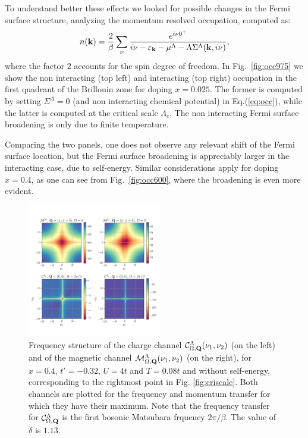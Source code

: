 To understand better these effects we looked for possible changes in the Fermi surface structure, analyzing the momentum resolved occupation, computed as: 
\begin{equation}
 n(\mathbf{k})  = \frac{2}{\beta} \sum_{\nu}\frac{e^{i\nu 0^+}}{i\nu-\varepsilon_{\mathbf{k}}-\mu^\Lambda-\Lambda\Sigma^\Lambda(\mathbf{k},i\nu)},\label{eq:occ} 
\end{equation}
where the factor $2$ accounts for the spin degree of freedom. 
In Fig.~\ref{fig:occ975} we show the non interacting (top left) and interacting (top right) occupation in the first quadrant of the Brillouin zone for doping $x=0.025$.
The former is computed by setting $\Sigma^\Lambda=0$ (and non interacting chemical potential) in Eq.(\ref{eq:occ}), while the latter is computed at the critical scale $\Lambda_c$. 
The non interacting Fermi surface broadening is only due to finite temperature.

Comparing the two panels, one does not observe any relevant shift of the Fermi surface location, but the Fermi surface broadening is appreciably larger in the interacting case, due to self-energy.
Similar considerations apply for doping $x=0.4$, as one can see from Fig.~\ref{fig:occ600}, where the broadening is even more evident.  

\begin{figure}
\hspace*{-1.0cm}
\includegraphics[width=0.52\textwidth]{images/Phi_color_all.png}
\caption{Frequency structure of the charge channel $\mathcal{C}^\Lambda_{\Omega,\mathbf{Q}}(\nu_1,\nu_2)$ (on the left) and of the magnetic channel $\mathcal{M}^\Lambda_{\Omega,\mathbf{Q}}(\nu_1,\nu_2)$ (on the right), for $x=0.4$, $t'=-0.32$, $U=4t$ and $T=0.08t$ and without self-energy, corresponding to the rightmost point in Fig. \ref{fig:criscale}. 
Both channels are plotted for the frequency and momentum transfer for which they have their maximum. Note that the frequency transfer for $\mathcal{C}^\Lambda_{\Omega,\mathbf{Q}}$ is the first bosonic Matsubara frquency $2\pi/\beta$. 
The value of $\delta$ is $1.13$.  
 }  
\label{fig:freqplot} 
\end{figure}

